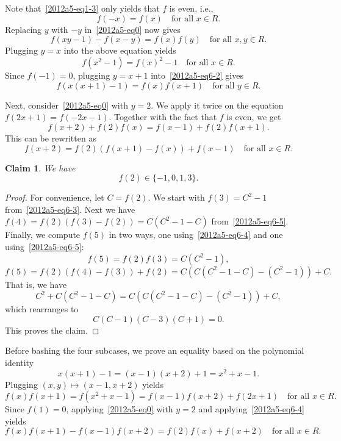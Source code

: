 \documentclass{article}
\newtheorem*{claim}{Claim}
\begin{document}
Note that~\eqref{2012a5-eq1-3} only yields that $f$ is even, i.e.,
\[ f(-x) = f(x) \quad \text{for all } x \in R. \tag{6.1}\label{2012a5-eq6-1} \]
Replacing $y$ with $-y$ in~\eqref{2012a5-eq0} now gives
\[ f(xy - 1) - f(x - y) = f(x) f(y) \quad \text{for all } x, y \in R. \tag{6.2}\label{2012a5-eq6-2} \]
Plugging $y = x$ into the above equation yields
\[ f(x^2 - 1) = f(x)^2 - 1 \quad \text{for all } x \in R. \tag{6.3}\label{2012a5-eq6-3} \]
Since $f(-1) = 0$, plugging $y = x + 1$ into~\eqref{2012a5-eq6-2} gives
\[ f(x(x + 1) - 1) = f(x) f(x + 1) \quad \text{for all } y \in R. \tag{6.4}\label{2012a5-eq6-4} \]

Next, consider~\eqref{2012a5-eq0} with $y = 2$.
We apply it twice on the equation $f(2x + 1) = f(-2x - 1)$.
Together with the fact that $f$ is even, we get
\[ f(x + 2) + f(2) f(x) = f(x - 1) + f(2) f(x + 1). \]
This can be rewritten as
\[ f(x + 2) = f(2) (f(x + 1) - f(x)) + f(x - 1) \quad \text{for all } x \in R. \tag{6.5}\label{2012a5-eq6-5} \]

\begin{claim}
We have \[ f(2) \in \{-1, 0, 1, 3\}. \]
\end{claim}
\begin{proof}
For convenience, let $C = f(2)$.
We start with $f(3) = C^2 - 1$ from~\eqref{2012a5-eq6-3}.
Next we have $f(4) = f(2) (f(3) - f(2)) = C (C^2 - 1 - C)$ from~\eqref{2012a5-eq6-5}.
Finally, we compute $f(5)$ in two ways, one using~\eqref{2012a5-eq6-4} and one using~\eqref{2012a5-eq6-5}:
\[ f(5) = f(2) f(3) = C(C^2 - 1), \]
\[ f(5) = f(2) (f(4) - f(3)) + f(2) = C(C(C^2 - 1 - C) - (C^2 - 1)) + C. \]
That is, we have
\[ C^2 + C(C^2 - 1 - C) = C(C(C^2 - 1 - C) - (C^2 - 1)) + C, \]
    which rearranges to
\[ C(C - 1)(C - 3)(C + 1) = 0. \]
This proves the claim.
\end{proof}

Before bashing the four subcases, we prove an equality based on the polynomial identity
\[ x(x + 1) - 1 = (x - 1)(x + 2) + 1 = x^2 + x - 1. \]
Plugging $(x, y) \mapsto (x - 1, x + 2)$ yields
\[ f(x) f(x + 1) = f(x^2 + x - 1) = f(x - 1) f(x + 2) + f(2x + 1) \quad \text{for all } x \in R. \]
Since $f(1) = 0$, applying~\eqref{2012a5-eq0} with $y = 2$ and applying~\eqref{2012a5-eq6-4} yields
\[ f(x) f(x + 1) - f(x - 1) f(x + 2) = f(2) f(x) + f(x + 2) \quad \text{for all } x \in R. \tag{6.6}\label{2012a5-eq6-6} \]
\end{document}
